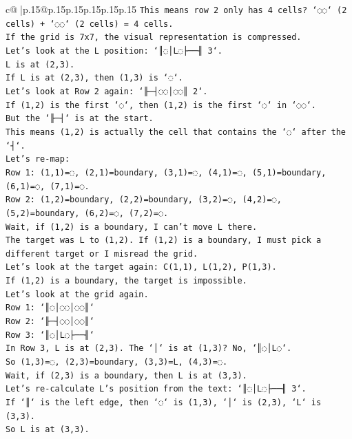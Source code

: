 \documentclass{article}
\begin{document}
{\begin{supertabular}{c@{$\;$}|p{.15\linewidth}@{}p{.15\linewidth}p{.15\linewidth}p{.15\linewidth}p{.15\linewidth}p{.15\linewidth}}
{{{\texttt{This means row 2 only has 4 cells? `◌◌` (2 cells) + `◌◌` (2 cells) = 4 cells.} \\
\texttt{If the grid is 7x7, the visual representation is compressed.} \\
\texttt{Let's look at the L position: `║◌│L◌├──╢ 3`.} \\
\texttt{L is at (2,3).} \\
\texttt{If L is at (2,3), then (1,3) is `◌`.} \\
\texttt{Let's look at Row 2 again: `╟─┤◌◌│◌◌║ 2`.} \\
\texttt{If (1,2) is the first `◌`, then (1,2) is the first `◌` in `◌◌`.} \\
\texttt{But the `╟─┤` is at the start.} \\
\texttt{This means (1,2) is actually the cell that contains the `◌` after the `┤`.} \\
\texttt{Let's re{-}map:} \\
\texttt{Row 1: (1,1)=◌, (2,1)=boundary, (3,1)=◌, (4,1)=◌, (5,1)=boundary, (6,1)=◌, (7,1)=◌.} \\
\texttt{Row 2: (1,2)=boundary, (2,2)=boundary, (3,2)=◌, (4,2)=◌, (5,2)=boundary, (6,2)=◌, (7,2)=◌.} \\
\texttt{Wait, if (1,2) is a boundary, I can't move L there.} \\
\texttt{The target was L to (1,2). If (1,2) is a boundary, I must pick a different target or I misread the grid.} \\
\texttt{Let's look at the target again: C(1,1), L(1,2), P(1,3).} \\
\texttt{If (1,2) is a boundary, the target is impossible.} \\
\texttt{Let's look at the grid again.} \\
\texttt{Row 1: `║◌│◌◌│◌◌║`} \\
\texttt{Row 2: `╟─┤◌◌│◌◌║`} \\
\texttt{Row 3: `║◌│L◌├──╢`} \\
\texttt{In Row 3, L is at (2,3). The `│` is at (1,3)? No, `║◌│L◌`.} \\
\texttt{So (1,3)=◌, (2,3)=boundary, (3,3)=L, (4,3)=◌.} \\
\texttt{Wait, if (2,3) is a boundary, then L is at (3,3).} \\
\texttt{Let's re{-}calculate L's position from the text: `║◌│L◌├──╢ 3`.} \\
\texttt{If `║` is the left edge, then `◌` is (1,3), `│` is (2,3), `L` is (3,3).} \\
\texttt{So L is at (3,3).} \\
}}}
\end{supertabular}}
\end{document}
